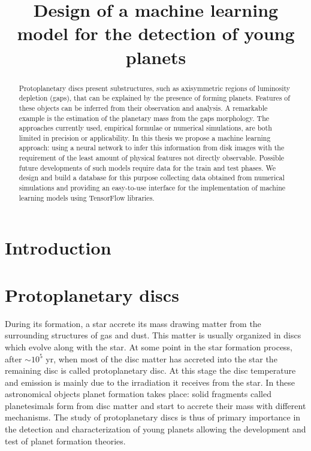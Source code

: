 \documentclass[a4paper,10pt]{report}
\title{Design of a machine learning model for the detection of young planets}
\author{}
\begin{document}
\maketitle

\begin{abstract}
    Protoplanetary discs present substructures,
    such as axisymmetric regions of luminosity depletion (gaps),
    that can be explained by the presence of forming planets. 
    Features of these objects can be inferred from their
    observation and analysis. A remarkable example is the 
    estimation of the planetary mass from the gaps morphology.
    The approaches currently used, empirical formulae or numerical
    simulations, are both limited in precision or applicability.
    In this thesis we propose a machine learning approach:
    using a neural network to infer this information from 
    disk images with the requirement of the least amount
    of physical features not directly observable.
    Possible future developments of such models require 
    data for the train and test phases.
    We design and build a database for this purpose collecting 
    data obtained from numerical simulations and providing an 
    easy-to-use interface for the implementation of machine learning
    models using TensorFlow libraries.
\end{abstract}

\tableofcontents

\chapter{Introduction}


\chapter{Protoplanetary discs}

During its formation, a star accrete its mass drawing matter from the surrounding structures
of gas and dust. This matter is usually organized in discs which evolve along with the star.
At some point in the star formation process, after $\sim 10^5$ yr, when most of the disc matter has accreted into the star the 
remaining disc is called protoplanetary disc. At this stage the disc temperature and emission is mainly due to the 
irradiation it receives from the star.
In these astronomical objects planet formation takes place: solid fragments called planetesimals form from disc matter and start to accrete 
their mass with different mechanisms.
The study of protoplanetary discs is thus of primary importance in the detection and characterization of young planets 
allowing the development and test of planet formation theories.
\end{document}
